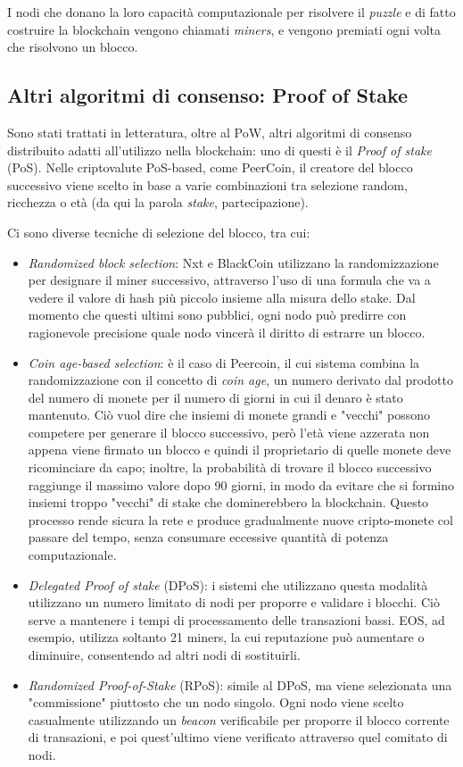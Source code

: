 I nodi che donano la loro capacità computazionale per risolvere il \textit{puzzle} e di fatto costruire la blockchain vengono chiamati \textit{miners}, e vengono premiati ogni volta che risolvono un blocco.


\subsection{Altri algoritmi di consenso: Proof of Stake}
\label{c:tec:bitcoin:pow}

Sono stati trattati in letteratura, oltre al PoW, altri algoritmi di consenso distribuito adatti all'utilizzo nella blockchain: uno di questi è il \textit{Proof of stake} (PoS)\cite{Li2005}. Nelle criptovalute PoS-based, come PeerCoin, il creatore del blocco successivo viene scelto in base a varie combinazioni tra selezione random, ricchezza o età (da qui la parola \textit{stake}, partecipazione).

Ci sono diverse tecniche di selezione del blocco, tra cui:

\begin{itemize}
    \item \textit{Randomized block selection}: Nxt e BlackCoin utilizzano la randomizzazione per designare il miner successivo, attraverso l'uso di una formula che va a vedere il valore di hash più piccolo insieme alla misura dello stake. Dal momento che questi ultimi sono pubblici, ogni nodo può predirre con ragionevole precisione quale nodo vincerà il diritto di estrarre un blocco.
    \item \textit{Coin age-based selection}: è il caso di Peercoin, il cui sistema combina la randomizzazione con il concetto di \textit{coin age}, un numero derivato dal prodotto del numero di monete per il numero di giorni in cui il denaro è stato mantenuto. Ciò vuol dire che insiemi di monete grandi e "vecchi" possono competere per generare il blocco successivo, però l'età viene azzerata non appena viene firmato un blocco e quindi il proprietario di quelle monete deve ricominciare da capo; inoltre, la probabilità di trovare il blocco successivo raggiunge il massimo valore dopo 90 giorni, in modo da evitare che si formino insiemi troppo "vecchi" di stake che dominerebbero la blockchain. Questo processo rende sicura la rete e produce gradualmente nuove cripto-monete col passare del tempo, senza consumare eccessive quantità di potenza computazionale. 
    \item \textit{Delegated Proof of stake} (DPoS): i sistemi che utilizzano questa modalità utilizzano un numero limitato di nodi per proporre e validare i blocchi. Ciò serve a mantenere i tempi di processamento delle transazioni bassi. EOS, ad esempio, utilizza soltanto 21 miners, la cui reputazione può aumentare o diminuire, consentendo ad altri nodi di sostituirli. 
    \item \textit{Randomized Proof-of-Stake} (RPoS): simile al DPoS, ma viene selezionata una "commissione" piuttosto che un nodo singolo. Ogni nodo viene scelto casualmente utilizzando un \textit{beacon} verificabile per proporre il blocco corrente di transazioni, e poi quest'ultimo viene verificato attraverso quel comitato di nodi.
\end{itemize}
